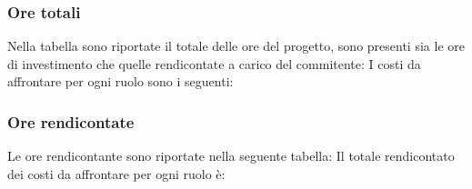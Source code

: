     \subsubsection{Ore totali}
        Nella tabella sono riportate il totale delle ore del progetto, sono presenti sia le ore di investimento che quelle rendicontate a carico del commitente:
        I costi da affrontare per ogni ruolo sono i seguenti:
    \subsubsection{Ore rendicontate}
        Le ore rendicontante sono riportate nella seguente tabella:
        Il totale rendicontato dei costi da affrontare per ogni ruolo è:
